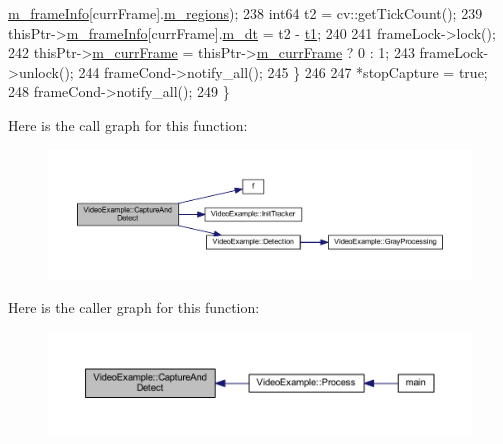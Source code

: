 \begin{DoxyCode}
      \mbox{\hyperlink{class_video_example_af5363ad3ed9a34bd105dbdaf274acb66}{m\_frameInfo}}[currFrame].\mbox{\hyperlink{struct_video_example_1_1_frame_info_aa4f6d562d893f578ad71144b2145fd50}{m\_regions}});
238         int64 t2 = cv::getTickCount();
239         thisPtr->\mbox{\hyperlink{class_video_example_af5363ad3ed9a34bd105dbdaf274acb66}{m\_frameInfo}}[currFrame].\mbox{\hyperlink{struct_video_example_1_1_frame_info_a1f0a32e6ab3a40b1173f73767523372f}{m\_dt}} = t2 - \mbox{\hyperlink{gml2nestedsql_8cpp_a214bd1a0500f5739ce581a8bcffb518a}{t1}};
240 
241         frameLock->lock();
242         thisPtr->\mbox{\hyperlink{class_video_example_a4adccbe4084f68f10d966901b168a98a}{m\_currFrame}} = thisPtr->\mbox{\hyperlink{class_video_example_a4adccbe4084f68f10d966901b168a98a}{m\_currFrame}} ? 0 : 1;
243         frameLock->unlock();
244         frameCond->notify\_all();
245     \}
246 
247     *stopCapture = \textcolor{keyword}{true};
248     frameCond->notify\_all();
249 \}
\end{DoxyCode}
Here is the call graph for this function\+:
\nopagebreak
\begin{figure}[H]
\begin{center}
\leavevmode
\includegraphics[width=350pt]{class_video_example_ace8617201da40b6e230bd6c049b48aa0_cgraph}
\end{center}
\end{figure}
Here is the caller graph for this function\+:
\nopagebreak
\begin{figure}[H]
\begin{center}
\leavevmode
\includegraphics[width=350pt]{class_video_example_ace8617201da40b6e230bd6c049b48aa0_icgraph}
\end{center}
\end{figure}
\mbox{\label{class_video_example_a5ea4a212997371399b01aed1d59a80b8}} 
